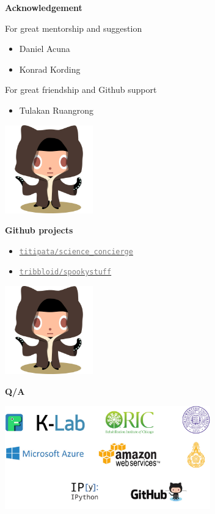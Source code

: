 \begin{frame}{\textbf{Acknowledgement}}

For great mentorship and suggestion
\begin{itemize}
\item Daniel Acuna
\item Konrad Kording
\end{itemize}

For great friendship and Github support
\begin{itemize}
\item Tulakan Ruangrong
\end{itemize}

\begin{center}
\includegraphics[width=1.5in]{images/octobiwan}
\end{center}

\end{frame}


\begin{frame}{\textbf{Github projects}}

\begin{itemize}
\item \href{https://github.com/titipata/science\_concierge}{\textcolor{gray}{\texttt{titipata/science\_concierge}}}
\item \href{https://github.com/tribbloid/spookystuff}{\textcolor{gray}{\texttt{tribbloid/spookystuff}}}
\end{itemize}

\begin{center}
\includegraphics[width=1.5in]{images/octobiwan}
\end{center}

\end{frame}


\begin{frame}

\begin{center}
\textbf{Q/A}
\end{center}

\begin{center}
\includegraphics[width=3.5in]{images/cover_back}
\end{center}

\end{frame}